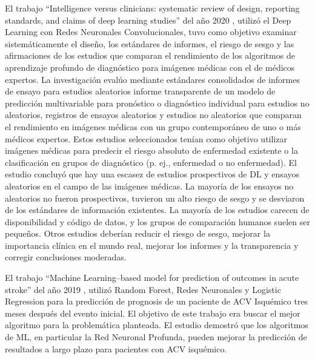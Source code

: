 \par El trabajo “Intelligence versus clinicians: systematic review of design, reporting standards, and claims of deep learning studies” del año 2020 \cite{Nagendran2020}, utilizó el Deep Learning con Redes Neuronales Convolucionales, tuvo como objetivo examinar sistemáticamente el diseño, los estándares de informes, el riesgo de sesgo y las afirmaciones de los estudios que comparan el rendimiento de los algoritmos de aprendizaje profundo de diagnóstico para imágenes médicas con el de médicos expertos. La investigación evalúo mediante estándares consolidados de informes de ensayo para estudios aleatorios informe transparente de un modelo de predicción multivariable para pronóstico o diagnóstico individual para estudios no aleatorios, registros de ensayos aleatorios y estudios no aleatorios que comparan el rendimiento en imágenes médicas con un grupo contemporáneo de uno o más médicos expertos. Estos estudios seleccionados tenían como objetivo utilizar imágenes médicas para predecir el riesgo absoluto de enfermedad existente o la clasificación en grupos de diagnóstico (p. ej., enfermedad o no enfermedad). El estudio concluyó que hay una escasez de estudios prospectivos de DL y ensayos aleatorios en el campo de las imágenes médicas. La mayoría de los ensayos no aleatorios no fueron prospectivos, tuvieron un alto riesgo de sesgo y se desviaron de los estándares de información existentes. La mayoría de los estudios carecen de disponibilidad y código de datos, y los grupos de comparación humanos suelen ser pequeños. Otros estudios deberían reducir el riesgo de sesgo, mejorar la importancia clínica en el mundo real, mejorar los informes y la transparencia y corregir conclusiones moderadas.\\

\par El trabajo “Machine Learning–based model for prediction of outcomes in acute stroke” del año 2019 \cite{Heo2019}, utilizó Random Forest, Redes Neuronales y Logistic Regression para la predicción de prognosis de un paciente de ACV Isquémico tres meses después del evento inicial. El objetivo de este trabajo era buscar el mejor algoritmo para la problemática planteada.
El estudio demostró que los algoritmos de ML, en particular la Red Neuronal Profunda, pueden mejorar la predicción de resultados a largo plazo para pacientes con ACV isquémico.\\

